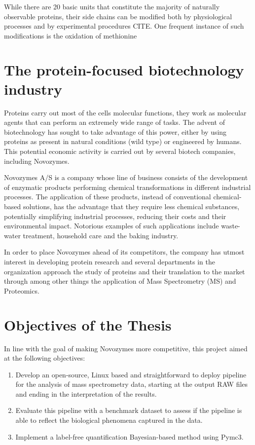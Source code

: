 \documentclass[11pt, a4paper]{report}
\begin{document}
While there are 20 basic units that constitute the majority of naturally observable proteins, their side chains can be modified both by physiological processes and by experimental procedures CITE. One frequent instance of such modifications is the oxidation of methionine


\section{The protein-focused biotechnology industry}


Proteins carry out most of the cell\textquotesingle s molecular functions, they work as molecular agents that can perform an extremely wide range of tasks. The advent of biotechnology has sought to take advantage of this power, either by using proteins as present in natural conditions (wild type) or engineered by humans. This potential economic activity is carried out by several biotech companies, including Novozymes.

Novozymes A/S is a company whose line of business consists of the development of enzymatic products performing chemical transformations in different industrial processes. The application of these products, instead of conventional chemical-based solutions, has the advantage that they require less chemical substances, potentially simplifying industrial processes, reducing their costs and their environmental impact. Notorious examples of such applications include waste-water treatment, household care and the baking industry.

In order to place Novozymes ahead of its competitors, the company has utmost interest in developing protein research and several departments in the organization approach the study of proteins and their translation to the market through among other things the application of Mass Spectrometry (\ac{MS}) and Proteomics.

\section{Objectives of the Thesis}
\label{sec:objectives}

In line with the goal of making Novozymes more competitive, this project aimed at the following objectives:

\begin{enumerate}

\item Develop an open-source, Linux based and straightforward to deploy pipeline for the analysis of mass spectrometry data, starting at the output RAW files and ending in the interpretation of the results.

\item Evaluate this pipeline with a benchmark dataset to assess if the pipeline is able to reflect the biological phenomena captured in the data.

\item Implement a label-free quantification Bayesian-based method using Pymc3.

\end{enumerate}
\end{document}
